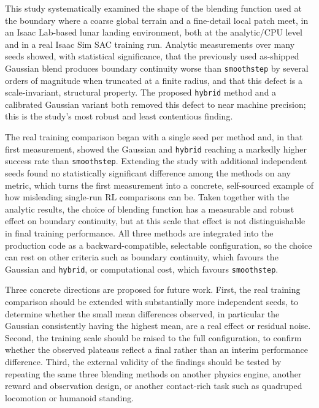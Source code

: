 This study systematically examined the shape of the blending function used at the boundary where a coarse global terrain and a fine-detail local patch meet, in an Isaac Lab-based lunar landing environment, both at the analytic/CPU level and in a real Isaac Sim SAC training run. Analytic measurements over many seeds showed, with statistical significance, that the previously used as-shipped Gaussian blend produces boundary continuity worse than \texttt{smoothstep} by several orders of magnitude when truncated at a finite radius, and that this defect is a scale-invariant, structural property. The proposed \texttt{hybrid} method and a calibrated Gaussian variant both removed this defect to near machine precision; this is the study's most robust and least contentious finding.

The real training comparison began with a single seed per method and, in that first measurement, showed the Gaussian and \texttt{hybrid} reaching a markedly higher success rate than \texttt{smoothstep}. Extending the study with additional independent seeds found no statistically significant difference among the methods on any metric, which turns the first measurement into a concrete, self-sourced example of how misleading single-run RL comparisons can be. Taken together with the analytic results, the choice of blending function has a measurable and robust effect on boundary continuity, but at this scale that effect is not distinguishable in final training performance. All three methods are integrated into the production code as a backward-compatible, selectable configuration, so the choice can rest on other criteria such as boundary continuity, which favours the Gaussian and \texttt{hybrid}, or computational cost, which favours \texttt{smoothstep}.

Three concrete directions are proposed for future work. First, the real training comparison should be extended with substantially more independent seeds, to determine whether the small mean differences observed, in particular the Gaussian consistently having the highest mean, are a real effect or residual noise. Second, the training scale should be raised to the full configuration, to confirm whether the observed plateaus reflect a final rather than an interim performance difference. Third, the external validity of the findings should be tested by repeating the same three blending methods on another physics engine, another reward and observation design, or another contact-rich task such as quadruped locomotion or humanoid standing.
